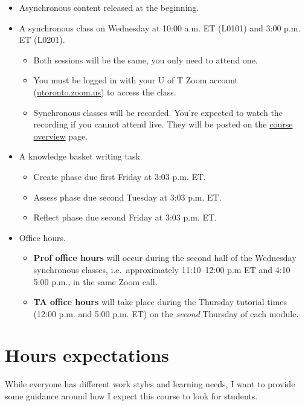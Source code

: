 \documentclass[
  openany]{book}
\begin{document}
\begin{itemize}
\item
  Asynchronous content released at the beginning.
\item
  A synchronous class on Wednesday at 10:00 a.m. ET (L0101) and 3:00 p.m. ET (L0201).

  \begin{itemize}
  \item
    Both sessions will be the same, you only need to attend one.
  \item
    You must be logged in with your U of T Zoom account (\href{https://utoronto.zoom.us}{utoronto.zoom.us}) to access the class.
  \item
    Synchronous classes will be recorded. You're expected to watch the recording if you cannot attend live. They will be posted on the \href{https://q.utoronto.ca/courses/253305/pages/course-overview}{course overview} page.
  \end{itemize}
\item
  A knowledge basket writing task.

  \begin{itemize}
  \item
    Create phase due first Friday at 3:03 p.m. ET.
  \item
    Assess phase due second Tuesday at 3:03 p.m. ET.
  \item
    Reflect phase due second Friday at 3:03 p.m. ET.
  \end{itemize}
\item
  Office hours.

  \begin{itemize}
  \item
    \textbf{Prof office hours} will occur during the second half of the Wednesday synchronous classes, i.e.~approximately 11:10--12:00 p.m ET and 4:10--5:00 p.m., in the same Zoom call.
  \item
    \textbf{TA office hours} will take place during the Thursday tutorial times (12:00 p.m. and 5:00 p.m. ET) on the \emph{second} Thursday of each module.
  \end{itemize}
\end{itemize}

\hypertarget{hours-expectations-1}{%
\section{Hours expectations}\label{hours-expectations-1}}

While everyone has different work styles and learning needs, I want to provide some guidance around how I expect this course to look for students.
\end{document}

